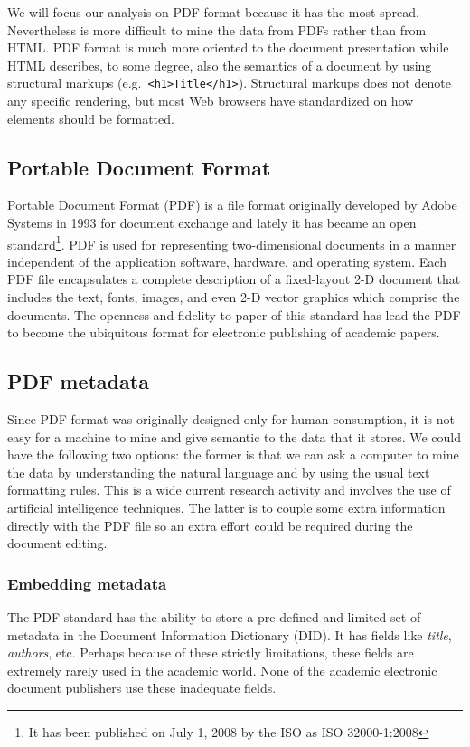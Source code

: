 We will focus our analysis on PDF format because it has the most spread. Nevertheless is more difficult to mine the data from PDFs rather than from HTML. PDF format is much more oriented to the document presentation while HTML describes, to some degree, also the semantics of a document by using structural markups (e.g.\ \texttt{<h1>Title</h1>}). Structural markups does not denote any specific rendering, but most Web browsers have standardized on how elements should be formatted.

\subsection{Portable Document Format}
Portable Document Format (PDF) is a file format originally developed by Adobe Systems in 1993 for document exchange and lately it has became an open standard\footnote{It has been published on July 1, 2008 by the ISO as ISO 32000-1:2008}. PDF is used for representing two-dimensional documents in a manner independent of the application software, hardware, and operating system. Each PDF file encapsulates a complete description of a fixed-layout 2-D document that includes the text, fonts, images, and even 2-D vector graphics which comprise the documents. The openness and fidelity to paper of this standard has lead the PDF to become the ubiquitous format for electronic publishing of academic papers.

\subsection{PDF metadata}
Since PDF format was originally designed only for human consumption, it is not easy for a machine to mine and give semantic to the data that it stores. We could have the following two options: the former is that we can ask a computer to mine the data by understanding the natural language and by using the usual text formatting rules. This is a wide current research activity and involves the use of artificial intelligence techniques. The latter is to couple some extra information directly with the PDF file so an extra effort could be required during the document editing.

\subsubsection{Embedding metadata}
The PDF standard has the ability to store a pre-defined and limited set of metadata in the Document Information Dictionary (DID). It has fields like \emph{title}, \emph{authors}, etc.  Perhaps because of these strictly limitations, these fields are extremely rarely used in the academic world. None of the academic electronic document publishers use these inadequate fields.

